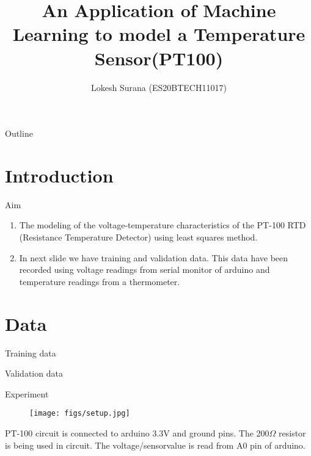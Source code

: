 \documentclass{beamer}
\title[PT-100 ]{An Application of Machine Learning to model a Temperature Sensor(PT100)}
\author{Lokesh Surana (ES20BTECH11017)}
\theoremstyle{remark}
\begin{document}
\begin{frame}
    \titlepage
\end{frame}

\begin{frame}{Outline}
    \tableofcontents
\end{frame}

\section{Introduction}
\begin{frame}{Aim}
    \begin{enumerate}
        \item The modeling of the voltage-temperature characteristics of the PT-100 RTD (Resistance Temperature Detector) using least squares method.
        \item In next slide we have training and validation data. This data have been recorded using voltage readings from serial monitor of arduino and temperature readings from a thermometer. 
    \end{enumerate}
\end{frame}

\section{Data}
\begin{frame}{Training data}
    \begin{table}[ht!]
        
        \caption{Training data}
        \label{tab:Training data}
    \end{table}
\end{frame}

\begin{frame}{Validation data}
    \begin{table}[!ht]
        \centering
        
        \caption{Validation data}
        \label{tab:Validation data}
    \end{table}
\end{frame}

\begin{frame}{Experiment}
    \begin{figure}[!ht]
         \centering
         \texttt{[image: figs/setup.jpg]}
     \end{figure}
     PT-100 circuit is connected to arduino 3.3V and ground pins. The 200$\Omega$ resistor is being used in circuit. The voltage/sensorvalue is read from A0 pin of arduino.
 \end{frame}
\end{document}
